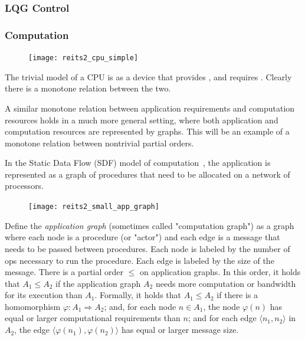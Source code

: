 \begin{figure}[h]
\caption{}
\end{figure}
 

\subsubsection{LQG Control}




\subsubsection{Computation}

\begin{figure}
\texttt{[image: reits2\_cpu\_simple]}\caption{}
\end{figure}
\leavevmode

The trivial model of a CPU is as a device that provides , and requires . Clearly there
is a monotone relation between the two.

A similar monotone relation between application requirements and computation
resources holds in a much more general setting, where both application
and computation resources are represented by graphs. This will be
an example of a monotone relation between nontrivial partial orders.

In the Static Data Flow (SDF) model of computation~\cite[Chapter 3]{sriram00,lee10},
the application is represented as a graph of procedures that need
to be allocated on a network of processors.

\begin{figure}
\texttt{[image: reits2\_small\_app\_graph]}
\end{figure}

Define the\emph{ application graph }(sometimes called "computation
graph") as a graph where each node is a procedure (or "actor")
and each edge is a message that needs to be passed between procedures.
Each node is labeled by the number of ops necessary to run the procedure.
Each edge is labeled by the size of the message. There is a partial
order $ \leq$ on application graphs. In this order, it holds that $A_1 \leq A_2$
if the application graph $A_2$ needs more computation or bandwidth
for its execution than $A_1$. Formally, it holds that $A_1 \leq A_2$
if there is a homomorphism $\varphi:A_1  \Rightarrow A_2$; and,
for each node $n∈A_1$, the node $\varphi(n)$ has equal or
larger computational requirements than $n$; and for each edge $⟨n_1,n_2⟩ $
in $A_2$, the edge $⟨\varphi(n_1),\varphi(n_2)⟩ $
has equal or larger message size.

